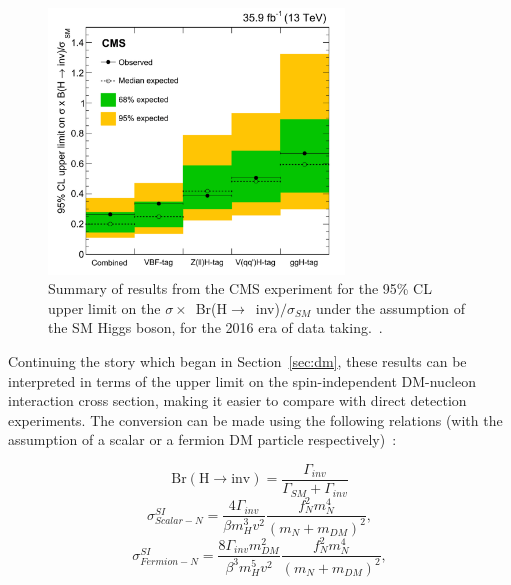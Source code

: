 \begin{figure}[htbp]
    \begin{center}
        \includegraphics[width=0.7\textwidth]{Theory/Limit_2016.png}
        \caption{Summary of results from the CMS experiment for the 95\% CL upper limit on the $\sigma \times$~Br(H$\rightarrow$~inv)$/\sigma_{SM}$ under the assumption of the SM Higgs boson, for the 2016 era of data taking.~\cite{paper:HIG_17_023}.}
      \label{fig:limit_2016}
    \end{center}
  \end{figure}
 
\hspace{10pt} Continuing the story which began in Section~\ref{sec:dm}, these results can be interpreted in terms of the upper limit on the spin-independent DM-nucleon interaction cross section, making it easier to compare with direct detection experiments. The conversion can be made using the following relations (with the assumption of a scalar or a fermion DM particle respectively)~\cite{paper:hinv_run1,paper:hig_portal_models1}:

\begin{equation}
    \text{Br}(\text{H}\rightarrow \text{inv}) = \frac{\Gamma_{inv}}{\Gamma_{SM}+\Gamma_{inv}}
\end{equation}
\begin{equation}
    \sigma^{SI}_{Scalar-N} = \frac{4\Gamma_{inv}}{\beta m^3_Hv^2}\frac{f_N^2m_N^4}{(m_N+m_{DM})^2},
\label{eq:xs_scalar}    
\end{equation}
\begin{equation}
    \sigma^{SI}_{Fermion-N} = \frac{8\Gamma_{inv}m_{DM}^2}{\beta^3m^5_Hv^2}\frac{f_N^2m_N^4}{(m_N+m_{DM})^2},
\label{eq:xs_ferm}  
\end{equation}

